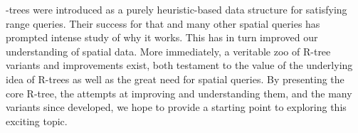 \rbase-trees were introduced as a purely heuristic-based data structure for satisfying range queries.
Their success for that and many other spatial queries has prompted intense study of why it works.
This has in turn improved our understanding of spatial data.
More immediately, a veritable zoo of R-tree variants and improvements exist, both testament to the value of the underlying idea of R-trees as well as the great need for spatial queries.
By presenting the core R-tree, the attempts at improving and understanding them, and the many variants since developed, we hope to provide a starting point to exploring this exciting topic.

